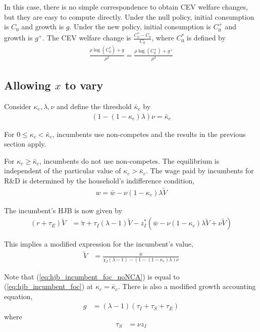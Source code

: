 \documentclass[12pt,english]{article}
\theoremstyle{remark}
\begin{document}
In this case, there is no simple correspondence to obtain CEV welfare changes, but they are easy to compute directly. Under the null policy, initial consumption is $C_0$ and growth is $g$. Under the new policy, initial consumption is $C_0^+$ and growth is $g^+$. The CEV welfare change is $\frac{C_0^* - C_0}{C_0}$, where $C_0^*$ is defined by 
\begin{align}
	\frac{\rho\log(C_0^*) + g}{\rho^2} = \frac{\rho \log(C_0^+) + g^+}{\rho^2} \label{eq:agg_welfare_log_CEV}
\end{align}

\subsection{Allowing $x$ to vary}

Consider $\kappa_{e}, \lambda, \nu$ and define the threshold $\bar{\kappa}_c$ by 
\begin{align}
	(1-(1-\kappa_{e})\lambda)\nu = \bar{\kappa}_c \label{eq_nca_threshold}
\end{align}

For $0 \le \kappa_{c} < \bar{\kappa}_c$, incumbents use non-competes and the results in the previous section apply.

For $\kappa_{c} \ge \bar{\kappa}_c$, incumbents do not use non-competes. The equilibrium is independent of the particular value of $\kappa_{c} > \bar{\kappa}_c$. The wage paid by incumbents for R\&D is determined by the household's indifference condition,
\begin{align}
	w = \bar{w} - \nu (1-\kappa_{e}) \lambda \tilde{V} \label{eq:wage_rd}
\end{align}

The incumbent's HJB is now given by 
\begin{align}
	(r + \tau_E) \tilde{V} &= \tilde{\pi} + \tau_I (\lambda - 1) \tilde{V} - z^*_I(\bar{w} - \nu (1-\kappa_{e}) \lambda \tilde{V} + \nu \tilde{V} ) \label{eq:hjb_incumbent_noNCA}
\end{align}

This implies a modified expression for the incumbent's value,
\begin{align}
\tilde{V} &= \frac{\bar{w}}{\chi_I(\lambda - 1) - (1-(1-\kappa_{e})\lambda)\nu} \label{eq:hjb_incumbent_foc_noNCA}
\end{align}

Note that (\ref{eq:hjb_incumbent_foc_noNCA}) is equal to (\ref{eq:hjb_incumbent_foc}) at $\kappa_{c} = \bar{\kappa}_c$. There is also a modified growth accounting equation,
\begin{align}
g &= (\lambda - 1)(\tau_I + \tau_S + \tau_E) \label{eq:growth_accounting_noNCA}
\end{align}
where
\begin{align}
	\tau_S &= \nu z_I \label{eq:arrival_spinout_noNCA}
\end{align}
\end{document}

